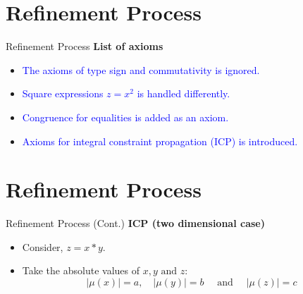 \documentclass[]{beamer}
\begin{document}
\section{Refinement Process}
\begin{frame}{Refinement Process}
    \textbf{List of axioms}
    \begin{itemize}
        \item \textcolor<1>{blue}{The axioms of type sign and commutativity is ignored.}
        \item \textcolor<2>{blue}{Square expressions $z = x^2$ is handled differently.}
		\item \textcolor<3>{blue}{Congruence for equalities is added as an axiom.}
		\item \textcolor<4>{blue}{Axioms for integral constraint propagation (ICP) is introduced.}
    \end{itemize}
\end{frame}

\section{Refinement Process}
\begin{frame}{Refinement Process (Cont.)}
    \textbf{ICP (two dimensional case)}
   \begin{itemize}
   \item Consider, $z = x*y$.
   \item Take the absolute values of $x, y \text{ and } z$:
$$|\mu(x)| = a, \quad  |\mu(y)| = b \quad \text{ and } \quad |\mu(z)| = c$$
\end{itemize}
\end{frame}
\end{document}

